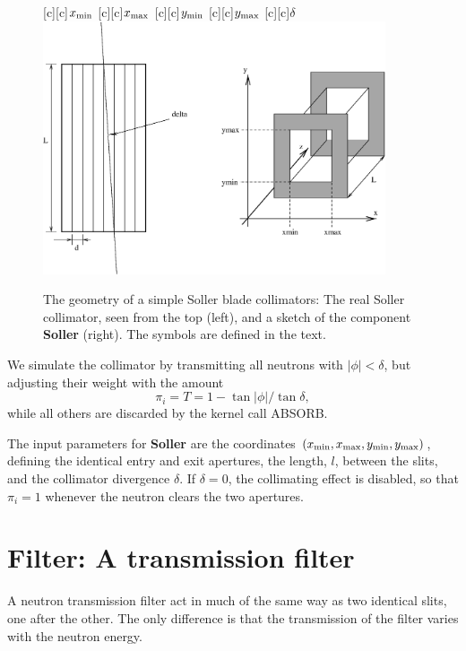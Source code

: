 \begin{figure}
  \begin{center}
    [c][c]{$x_{\rm min}$}
    [c][c]{$x_{\rm max}$}
    [c][c]{$y_{\rm min}$}
    [c][c]{$y_{\rm max}$}
    [c][c]{$\delta$}
    \includegraphics[width=0.9\textwidth]{figures/collimator.eps}
  \end{center}
\caption{The geometry of a simple Soller blade collimators:
The real Soller collimator, seen from the top (left), 
and a sketch of the component {\bf Soller} (right).
The symbols are defined in the text.}
\label{f:collimator}
\end{figure}

We simulate the collimator by transmitting all neutrons with
$|\phi| < \delta$, but adjusting their weight with the amount
\begin{equation}
\pi_i = T = 1-\tan|\phi|/ \tan\delta ,
\end{equation}
while all others are discarded by the kernel call ABSORB.

The input parameters for {\bf Soller} are the coordinates
$(x_{\rm min}, x_{\rm max}, y_{\rm min}, y_{\rm max})$,
defining the identical entry and exit apertures, 
the length, $l$, between the slits, 
and the collimator divergence $\delta$.
If $\delta=0$, the collimating effect is disabled,
so that $\pi_i = 1$ whenever the neutron clears the two apertures.

\section{Filter: A transmission filter}
A neutron transmission filter act in much of the same way as two
identical slits, one after the other.
The only difference is that the transmission of the filter
varies with the neutron energy.

